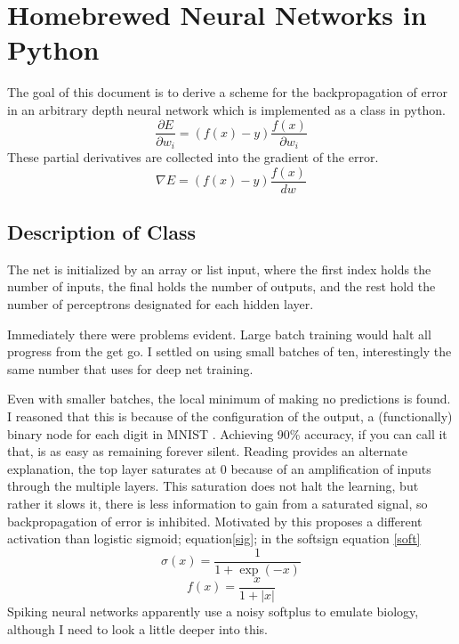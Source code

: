 \documentclass[a4paper,12pt]{report}
\begin{document}
\chapter{Homebrewed Neural Networks in Python}
The goal of this document is to derive a scheme for the backpropagation of error in an arbitrary depth neural network which is implemented as a class in python.
\begin{equation}
\frac{\partial E}{\partial w_i} = \left( f(x) - y \right) \frac{f(x)}{\partial w_i}
\end{equation} 
These partial derivatives are collected into the gradient of the error.
\begin{equation}
	\nabla E = (f(x) - y) \frac{f(x)}{dw}
\end{equation}
\section{Description of Class}
The net is initialized by an array or list input, where the first index holds the number of inputs, the final holds the number of outputs, and the rest hold the number of perceptrons designated for each hidden layer.

Immediately there were problems evident. Large batch training would halt all progress from the get go. I settled on using small batches of ten, interestingly the same number that \cite{understand} uses for deep net training. 

Even with smaller batches, the local minimum of making no predictions is found. I reasoned that this is because of the configuration of the output, a (functionally) binary node for each digit in MNIST \cite{mnist}. Achieving 90\% accuracy, if you can call it that, is as easy as remaining forever silent. Reading \cite{understand} provides an alternate explanation, the top layer saturates at 0 because of an amplification of inputs through the multiple layers. This saturation does not halt the learning, but rather it slows it, there is less information to gain from a saturated signal, so backpropagation of error is inhibited. Motivated by this \cite{understand} proposes a different activation than logistic sigmoid; equation\ref{sig}; in the softsign equation \ref{soft}
\begin{equation} \label{sig}
\sigma(x) = \frac{1}{1+\exp \left(-x\right)}
\end{equation}
\begin{equation} \label{soft}
f(x) = \frac{x}{1+|x|}
\end{equation}
Spiking neural networks apparently use a noisy softplus to emulate biology, although I need to look a little deeper into this.
\end{document}
